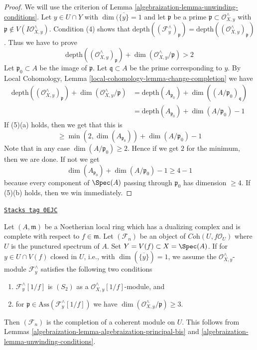 \begin{proof}

We will use the criterion of Lemma \ref{algebraization-lemma-unwinding-conditions}.
Let $y \in U \cap Y$ with $\dim(\overline{\{y\}} = 1$ and let
$\mathfrak p$ be a prime $\mathfrak p \subset \mathcal{O}_{X, y}^\wedge$ with
$\mathfrak p \not \in V(I\mathcal{O}_{X, y}^\wedge)$.
Condition (4) shows that
$\text{depth}((\mathcal{F}_y^\wedge)_\mathfrak p) =
\text{depth}((\mathcal{O}_{X, y}^\wedge)_\mathfrak p)$.
Thus we have to prove
$$
\text{depth}((\mathcal{O}_{X, y}^\wedge)_\mathfrak p) +
\dim(\mathcal{O}_{X, y}^\wedge/\mathfrak p) > 2
$$
Let $\mathfrak p_0 \subset A$ be the image of $\mathfrak p$.
Let $\mathfrak q \subset A$ be the prime corresponding to $y$.
By Local Cohomology, Lemma
\ref{local-cohomology-lemma-change-completion}
we have
\begin{align*}
\text{depth}((\mathcal{O}_{X, y}^\wedge)_\mathfrak p) +
\dim(\mathcal{O}_{X, y}^\wedge/\mathfrak p)
& =
\text{depth}(A_{\mathfrak p_0}) + \dim((A/\mathfrak p_0)_\mathfrak q) \\
& =
\text{depth}(A_{\mathfrak p_0}) + \dim(A/\mathfrak p_0) - 1
\end{align*}
If (5)(a) holds, then we get that this is
$$
\geq \min(2, \dim(A_{\mathfrak p_0})) + \dim(A/\mathfrak p_0) - 1
$$
Note that in any case $\dim(A/\mathfrak p_0) \geq 2$. Hence if
we get $2$ for the minimum, then we are done. If not we get
$$
\dim(A_{\mathfrak p_0}) + \dim(A/\mathfrak p_0) - 1 \geq 4 - 1
$$
because every component of $\Spec(A)$ passing through $\mathfrak p_0$
has dimension $\geq 4$. If (5)(b) holds, then we win immediately.
\end{proof}

\begin{remark}
\label{algebraization-remark-interesting-case-bis}
\href{https://stacks.math.columbia.edu/tag/0EJC}{\texttt{Stacks tag 0EJC}}

Let $(A, \mathfrak m)$ be a Noetherian local ring which has a
dualizing complex and is complete with respect to $f \in \mathfrak m$.
Let $(\mathcal{F}_n)$ be an object of $\textit{Coh}(U, f\mathcal{O}_U)$
where $U$ is the punctured spectrum of $A$.
Set $Y = V(f) \subset X = \Spec(A)$.
If for $y \in U \cap V(f)$ closed in $U$, i.e., with
$\dim(\overline{\{y\}}) = 1$, we assume the
$\mathcal{O}_{X, y}^\wedge$-module $\mathcal{F}_y^\wedge$
satisfies the following two conditions
\begin{enumerate}
\item $\mathcal{F}_y^\wedge[1/f]$ is $(S_2)$ as a
$\mathcal{O}_{X, y}^\wedge[1/f]$-module, and
\item for $\mathfrak p \in \text{Ass}(\mathcal{F}_y^\wedge[1/f])$
we have $\dim(\mathcal{O}_{X, y}^\wedge/\mathfrak p) \geq 3$.
\end{enumerate}
Then $(\mathcal{F}_n)$ is the completion of a coherent module on $U$.
This follows from Lemmas \ref{algebraization-lemma-algebraization-principal-bis}
and \ref{algebraization-lemma-unwinding-conditions}.
\end{remark}

